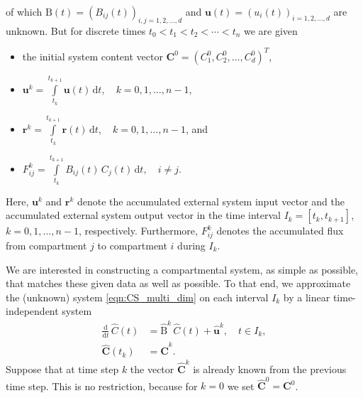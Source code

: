 \documentclass[11pt,a4paper]{article}
\renewcommand{\vec}[1]{\mathbf{#1}}
\newcommand{\tens}[1]{\mathrm{#1}}
\newcommand{\deriv}[1]{\frac{\mathrm{d}}{\mathrm{d}#1}}
\newcommand{\dd}[1]{\,\mathrm{d}#1}
\newcommand{\intl}{\int\limits}
\begin{document}
        of which $\tens{B}(t)=(B_{ij}(t))_{i,j=1,2,\ldots,d}$ and $\vec{u}(t)=(u_i(t))_{i=1,2,\ldots,d}$ are unknown.
        But for discrete times $t_0<t_1<t_2<\cdots<t_n$ we are given
        \begin{itemize}
            \item the initial system content vector $\vec{C}^0=(C^0_1,C^0_2,\ldots,C^0_d)^T$,
            \item $\vec{u}^k = \intl_{t_k}^{t_{k+1}} \vec{u}(t)\dd{t},\quad k=0,1,\ldots,n-1$, 
            \item $\vec{r}^k = \intl_{t_k}^{t_{k+1}} \vec{r}(t)\dd{t},\quad k=0,1,\ldots,n-1$, and
            \item $F_{ij}^k = \intl_{t_k}^{t_{k+1}} B_{ij}(t)\,C_j(t)\dd{t},\quad i\neq j$.
        \end{itemize}
        Here, $\vec{u}^k$ and $\vec{r}^k$ denote the accumulated external system input vector and the accumulated external system output vector in the time interval $I_k=[t_k,t_{k+1}]$, $k=0,1,\ldots,n-1$, respectively.
        Furthermore, $F^k_{ij}$ denotes the accumulated flux from compartment $j$ to compartment $i$ during $I_k$.

        We are interested in constructing a compartmental system, as simple as possible, that matches these given data as well as possible.
        To that end, we approximate the (unknown) system \eqref{eqn:CS_multi_dim} on each interval $I_k$ by a linear time-independent system
        \begin{equation}\label{eqn:CS_multi_dim_approx}
            \begin{aligned}
                \deriv{t}\,\widehat{C}(t) &= \widehat{\tens{B}}^k\,\widehat{C}(t) + \widehat{\vec{u}}^k,\quad t\in I_k,\\
                \widehat{\vec{C}}(t_k) &= \widehat{\vec{C}}^k.
            \end{aligned}
        \end{equation}
        Suppose that at time step $k$ the vector $\widehat{\vec{C}}^k$ is already known from the previous time step.
        This is no restriction, because for $k=0$ we set $\widehat{\vec{C}}^0=\vec{C}^0$.
\end{document}
